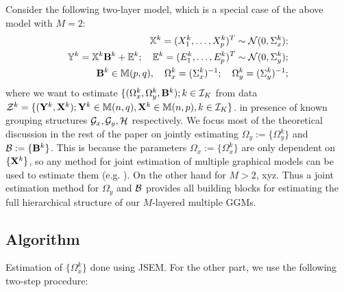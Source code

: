 Consider the following two-layer model, which is a special case of the above model with $M=2$:
%
\begin{eqnarray}
{\mathbb{X}}^k = (X^k_1, \ldots, X^k_p)^T \sim {\cal{N}} (0, \Sigma^k_x);\\
{\mathbb{Y}}^k = {\mathbb{X}}^k {\mathbf{B}}^k + {\mathbb{E}}^k; \quad {\mathbb{E}}^k = (E^k_1, \ldots, E^k_p)^T \sim {\cal{N}} (0, \Sigma^k_y);\\
{\mathbf{B}}^k \in {\mathbb{M}}(p,q), \quad \Omega^k_x = (\Sigma^k_x)^{-1}; \quad \Omega^k_y = (\Sigma^k_y)^{-1};
\end{eqnarray}
%
where we want to estimate $\{ (\Omega^k_x, \Omega^k_y, {\mathbf{B}}^k); k \in {\cal{I}}_K$ from data ${\cal{Z}}^k = \{ ({\mathbf{Y}}^k, {\mathbf{X}}^k); {\mathbf{Y}}^k \in {\mathbb{M}}(n,q), {\mathbf{X}}^k \in {\mathbb{M}}(n,p), k \in {\cal{I}}_K\}$. in presence of known grouping structures ${\cal{G}}_x, {\cal{G}}_y, {\cal{H}}$ respectively. We focus most of the theoretical discussion in the rest of the paper on jointly estimating $\Omega_y:= \{ \Omega_y^k \}$ and ${\cal{B}} := \{ {\mathbf{B}}^k \}$. This is because the parameters $\Omega_x := \{ \Omega_x^k \}$ are only dependent on $\{ {\mathbf{X}}^k\}$, so any method for joint estimation of multiple graphical models can be used to estimate them (e.g. \cite{GuoEtal11, MaMichailidis15}). On the other hand for $M>2$, xyz. Thus a joint estimation method for $\Omega_y$ and ${\cal{B}}$ provides all building blocks for estimating the full hierarchical structure of our $M$-layered multiple GGMs.




\subsection{Algorithm}
Estimation of $\{ \Omega_x^k \}$ done using JSEM. For the other part, we use the following two-step procedure:

